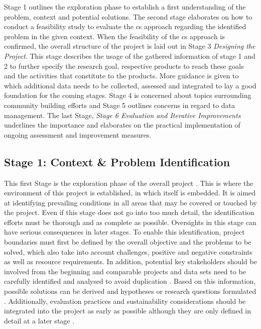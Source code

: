 Stage 1 outlines the exploration phase to establish a first understanding of the problem, context and potential solutions. The second stage elaborates on how to conduct a feasibility study to evaluate the \acrshort{cs} approach regarding the identified problem in the given context. When the feasibility of the \acrshort{cs} approach is confirmed, the overall structure of the project is laid out in Stage 3 \textit{Designing the Project}. This stage describes the usage of the gathered information of stage 1 and 2 to further specify the research goal, respective products to reach these goals and the activities that constitute to the products. More guidance is given to which additional data needs to be collected, assessed and integrated to lay a good foundation for the coming stages. Stage 4 is concerned about topics surrounding community building efforts and Stage 5 outlines concerns in regard to data management. The last Stage, \textit{Stage 6 Evaluation and Iterative Improvements} underlines the importance and elaborates on the practical implementation of ongoing assessment and improvement measures.

\subsection{Stage 1: Context \& Problem Identification}\label{subsec:stage1_design}

This first Stage is the exploration phase of the overall project \autocite{citizenscience.govBasicStepsYour}. This is where the environment of this project is established, in which itself is embedded. It is aimed at identifying prevailing conditions in all areas that may be covered or touched by the project. Even if this stage does not go into too much detail, the identification efforts must be thorough and as complete as possible. Oversights in this stage can have serious consequences in later stages. To enable this identification, project boundaries must first be defined by the overall objective and the problems to be solved, which also take into account challenges, positive and negative constraints as well as resource requirements. In addition, potential key stakeholders should be involved from the beginning and comparable projects and data sets need to be carefully identified and analysed to avoid duplication \autocite{citizenscience.govBasicStepsYour,fraislCitizenScienceEnvironmental2022,minkmanCitizenScienceWater2015}. Based on this information, possible solutions can be derived and hypotheses or research questions formulated \autocite{silvertownNewDawnCitizen2009}. Additionally, evaluation practices and sustainability considerations should be integrated into the project as early as possible although they are only defined in detail at a later stage \autocite{fraislCitizenScienceEnvironmental2022}.

